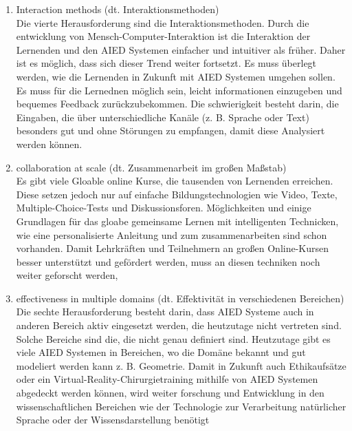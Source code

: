 \begin{enumerate}
    \item Interaction methods (dt. Interaktionsmethoden) \\
    Die vierte Herausforderung sind die Interaktionsmethoden. Durch die entwicklung von Mensch-Computer-Interaktion ist die Interaktion der Lernenden und den AIED Systemen einfacher und intuitiver als früher.
    Daher ist es möglich, dass sich dieser Trend weiter fortsetzt. Es muss überlegt werden, wie die Lernenden in Zukunft mit AIED Systemen umgehen sollen.
    Es muss für die Lernednen möglich sein, leicht informationen einzugeben und bequemes Feedback zurückzubekommen. Die schwierigkeit besteht darin, die Eingaben, die über unterschiedliche Kanäle (z. B. Sprache oder Text) besonders gut und ohne Störungen zu empfangen, damit diese Analysiert werden können.


    \item collaboration at scale (dt. Zusammenarbeit im großen Maßstab) \\
    Es gibt viele Gloable online Kurse, die tausenden von Lernenden erreichen. Diese setzen jedoch nur auf einfache Bildungstechnologien wie Video, Texte, Multiple-Choice-Tests und Diskussionsforen.
    Möglichkeiten und einige Grundlagen für das gloabe gemeinsame Lernen mit intelligenten Technicken, wie eine personalisierte Anleitung und zum zusammenarbeiten sind schon vorhanden. 
    Damit Lehrkräften und Teilnehmern an großen Online-Kursen besser unterstützt und gefördert werden, muss an diesen techniken noch weiter geforscht werden,
    
    \item effectiveness in multiple domains (dt. Effektivität in verschiedenen Bereichen) \\
    Die sechte Herausforderung besteht darin, dass AIED Systeme auch in anderen Bereich aktiv eingesetzt werden, die heutzutage nicht vertreten sind. Solche Bereiche sind die, die nicht genau definiert sind.
    Heutzutage gibt es viele AIED Systemen in Bereichen, wo die Domäne bekannt und gut modeliert werden kann z. B. Geometrie.
    Damit in Zukunft auch Ethikaufsätze oder ein Virtual-Reality-Chirurgietraining mithilfe von AIED Systemen abgedeckt werden können, wird weiter forschung und Entwicklung in den wissenschaftlichen Bereichen wie der Technologie zur Verarbeitung natürlicher Sprache oder der Wissensdarstellung benötigt
     

\end{enumerate}
